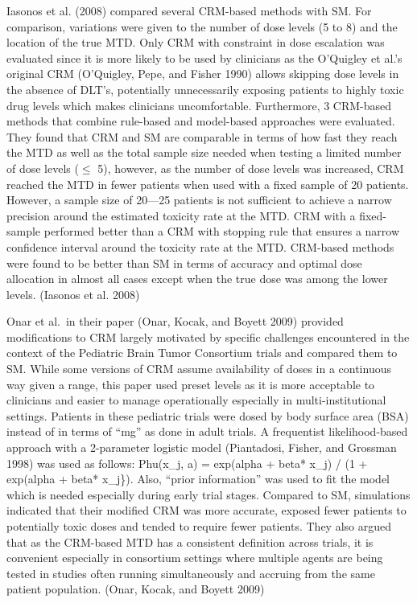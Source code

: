 \documentclass[
]{article}
\begin{document}
Iasonos et al. (2008) compared several CRM-based methods with SM. For
comparison, variations were given to the number of dose levels (5 to 8)
and the location of the true MTD. Only CRM with constraint in dose
escalation was evaluated since it is more likely to be used by
clinicians as the O'Quigley et al.'s original CRM (O'Quigley, Pepe, and
Fisher 1990) allows skipping dose levels in the absence of DLT's,
potentially unnecessarily exposing patients to highly toxic drug levels
which makes clinicians uncomfortable. Furthermore, 3 CRM-based methods
that combine rule-based and model-based approaches were evaluated. They
found that CRM and SM are comparable in terms of how fast they reach the
MTD as well as the total sample size needed when testing a limited
number of dose levels (\(\leq\) 5), however, as the number of dose
levels was increased, CRM reached the MTD in fewer patients when used
with a fixed sample of 20 patients. However, a sample size of 20---25
patients is not sufficient to achieve a narrow precision around the
estimated toxicity rate at the MTD. CRM with a fixed-sample performed
better than a CRM with stopping rule that ensures a narrow confidence
interval around the toxicity rate at the MTD. CRM-based methods were
found to be better than SM in terms of accuracy and optimal dose
allocation in almost all cases except when the true dose was among the
lower levels. (Iasonos et al. 2008)

Onar et al.~in their paper (Onar, Kocak, and Boyett 2009) provided
modifications to CRM largely motivated by specific challenges
encountered in the context of the Pediatric Brain Tumor Consortium
trials and compared them to SM. While some versions of CRM assume
availability of doses in a continuous way given a range, this paper used
preset levels as it is more acceptable to clinicians and easier to
manage operationally especially in multi-institutional settings.
Patients in these pediatric trials were dosed by body surface area (BSA)
instead of in terms of ``mg'' as done in adult trials. A frequentist
likelihood-based approach with a 2-parameter logistic model (Piantadosi,
Fisher, and Grossman 1998) was used as follows: Phu(x\_j, a) = exp(alpha
+ beta* x\_j) / (1 + exp(alpha + beta* x\_j\}). Also, ``prior
information'' was used to fit the model which is needed especially
during early trial stages. Compared to SM, simulations indicated that
their modified CRM was more accurate, exposed fewer patients to
potentially toxic doses and tended to require fewer patients. They also
argued that as the CRM-based MTD has a consistent definition across
trials, it is convenient especially in consortium settings where
multiple agents are being tested in studies often running simultaneously
and accruing from the same patient population. (Onar, Kocak, and Boyett
2009)
\end{document}
